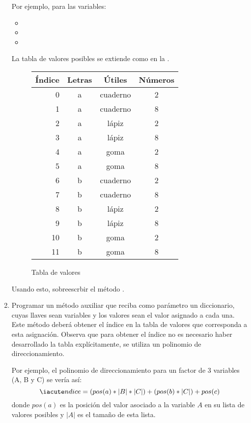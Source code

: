 \begin{enumerate}
  Por ejemplo, para las variables:
  \begin{itemize}
   \item {}
   \item {}
   \item {}
  \end{itemize}
  La tabla de valores posibles se extiende como en la .
  
  \begin{figure}
        \centering
        \begin{tabular}{r c c c}
         \tiny{Índice} & Letras & Útiles & Números \\ \hline
         \tiny{0} & a & cuaderno & 2 \\
         \tiny{1} & a & cuaderno & 8 \\
         \tiny{2} & a & lápiz    & 2 \\
         \tiny{3} & a & lápiz    & 8 \\
         \tiny{4} & a & goma     & 2 \\
         \tiny{5} & a & goma     & 8 \\
         \tiny{6} & b & cuaderno & 2 \\
         \tiny{7} & b & cuaderno & 8 \\
         \tiny{8} & b & lápiz    & 2 \\
         \tiny{9} & b & lápiz    & 8 \\
         \tiny{10} & b & goma     & 2 \\
         \tiny{11} & b & goma     & 8 \\
        \end{tabular}
        \caption{Tabla de valores}
        \label{fig:tablavalores}
  \end{figure}
  
  Usando esto, sobreescrbir el método .

  \item Programar un método auxiliar que reciba como parámetro un diccionario, cuyas llaves sean variables y los valores sean el valor asignado a cada una.  Este método deberá obtener el índice en la tabla de valores que corresponda a esta asignación.  Observa que para obtener el índice no es necesario haber desarrollado la tabla explícitamente, se utiliza un polinomio de direccionamiento.
  
  Por ejemplo, el polinomio de direccionamiento para un factor de 3 variables (A, B y C) se vería así:
      \[\iacute ndice = (pos(a) * |B| * |C|) + (pos(b) * |C|) + pos(c)\]
    donde \(pos(a)\) es la posición del valor asociado a la variable \(A\) en su lista de valores posibles y \(|A|\) es el tamaño de esta lista.
    

\end{enumerate}
